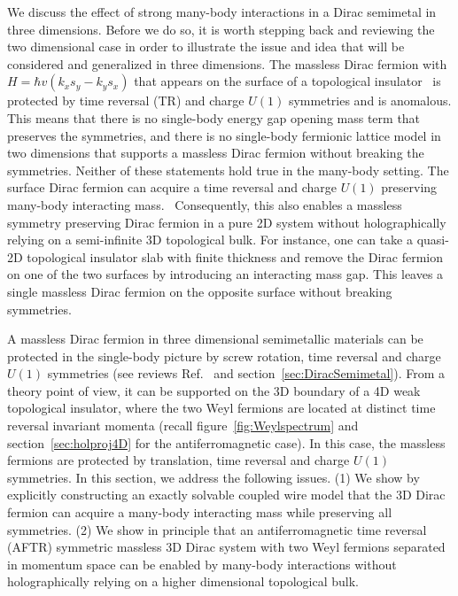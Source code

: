 We discuss the effect of strong many-body interactions in a Dirac semimetal in three dimensions. Before we do so, it is worth stepping back and reviewing the two dimensional case in order to illustrate the issue and idea that will be considered and generalized in three dimensions. The massless Dirac fermion with $H=\hbar v(k_xs_y-k_ys_x)$ that appears on the surface of a topological insulator~\cite{HasanKane10,QiZhangreview11,HasanMoore11,RMP} is protected by time reversal (TR) and charge $U(1)$ symmetries and is anomalous. This means that there is no single-body energy gap opening mass term that preserves the symmetries, and there is no single-body fermionic lattice model in two dimensions that supports a massless Dirac fermion without breaking the symmetries. Neither of these statements hold true in the many-body setting. The surface Dirac fermion can acquire a time reversal and charge $U(1)$ preserving many-body interacting mass.~\cite{WangPotterSenthilgapTI13,ChenFidkowskiVishwanath14,MetlitskiKaneFisher13b,BondersonNayakQi13} Consequently, this also enables a massless symmetry preserving Dirac fermion in a pure 2D system without holographically relying on a semi-infinite 3D topological bulk. For instance, one can take a quasi-2D topological insulator slab with finite thickness and remove the Dirac fermion on one of the two surfaces by introducing an interacting mass gap. This leaves a single massless Dirac fermion on the opposite surface without breaking symmetries.

A massless Dirac fermion in three dimensional semimetallic materials can be protected in the single-body picture by screw rotation, time reversal and charge $U(1)$ symmetries (see reviews Ref.~ and section~\ref{sec:DiracSemimetal}). From a theory point of view, it can be supported on the 3D boundary of a 4D weak topological insulator, where the two Weyl fermions are located at distinct time reversal invariant momenta (recall figure~\ref{fig:Weylspectrum} and section~\ref{sec:holproj4D} for the antiferromagnetic case). In this case, the massless fermions are protected by translation, time reversal and charge $U(1)$ symmetries. In this section, we address the following issues. (1) We show by explicitly constructing an exactly solvable coupled wire model that the 3D Dirac fermion can acquire a many-body interacting mass while preserving all symmetries. (2) We show in principle that an antiferromagnetic time reversal (AFTR) symmetric massless 3D Dirac system with two Weyl fermions separated in momentum space can be enabled by many-body interactions without holographically relying on a higher dimensional topological bulk.

